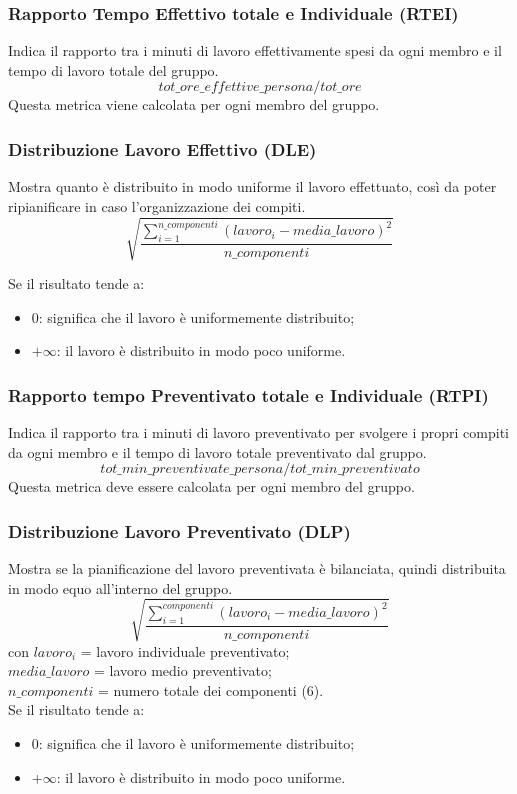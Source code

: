 \subsubsection{Rapporto Tempo Effettivo totale e Individuale (RTEI)}
Indica il rapporto tra i minuti di lavoro effettivamente spesi da ogni membro e il tempo di lavoro totale del gruppo. 
\[tot\_ore\_effettive\_persona / tot\_ore
\]
Questa metrica viene calcolata per ogni membro del gruppo.
\subsubsection{Distribuzione Lavoro Effettivo (DLE)}
Mostra quanto è distribuito in modo uniforme il lavoro effettuato, così da poter ripianificare in caso l'organizzazione dei compiti.
\[\sqrt{\frac{\sum_{i=1}^{n\_componenti}(lavoro_i-media\_lavoro)^2}{n\_componenti}}\]

Se il risultato tende a:
\begin{itemize}
    \item 0: significa che il lavoro è uniformemente distribuito;
    \item $+\infty$: il lavoro è distribuito in modo poco uniforme.
\end{itemize}

\subsubsection{Rapporto tempo Preventivato totale e Individuale (RTPI)}
Indica il rapporto tra i minuti di lavoro preventivato per svolgere i propri compiti da ogni membro e il tempo di lavoro totale preventivato dal gruppo. 
\[tot\_min\_preventivate\_persona / tot\_min\_preventivato\]
Questa metrica deve essere calcolata per ogni membro del gruppo.
\subsubsection{Distribuzione Lavoro Preventivato (DLP)}
Mostra se la pianificazione del lavoro preventivata è bilanciata, quindi distribuita in modo equo all'interno del gruppo.
\[\sqrt{\frac{\sum_{i=1}^{componenti}(lavoro_i-media\_lavoro)^2}{n\_componenti}}\]
con $lavoro_i$ = lavoro individuale preventivato;\\
$media\_lavoro$ = lavoro medio preventivato;\\
$n\_componenti$ = numero totale dei componenti (6).
\\Se il risultato tende a:
\begin{itemize}
    \item 0: significa che il lavoro è uniformemente distribuito;
    \item $+\infty$: il lavoro è distribuito in modo poco uniforme.
\end{itemize}
